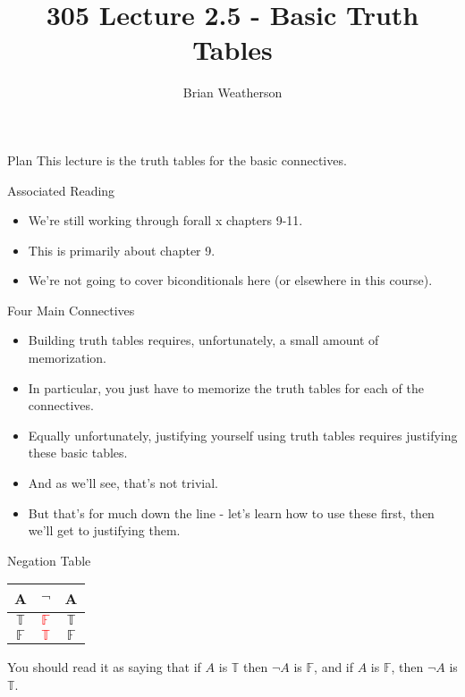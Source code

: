 \documentclass[
  ignorenonframetext,
]{beamer}
\title{305 Lecture 2.5 - Basic Truth Tables}
\author{Brian Weatherson}
\date{}
\providecommand{\tightlist}{%
  \setlength{\itemsep}{0pt}\setlength{\parskip}{0pt}}
\renewcommand{\,}{\text{, }}
\def\True{\mathbb{T}}
\def\False{\mathbb{F}}
\begin{document}
\frame{\titlepage}

\begin{frame}{Plan}
\protect\hypertarget{plan}{}
This lecture is the truth tables for the basic connectives.
\end{frame}

\begin{frame}{Associated Reading}
\protect\hypertarget{associated-reading}{}
\begin{itemize}
\tightlist
\item
  We're still working through forall x chapters 9-11.
\item
  This is primarily about chapter 9.
\item
  We're not going to cover biconditionals here (or elsewhere in this
  course).
\end{itemize}
\end{frame}

\begin{frame}{Four Main Connectives}
\protect\hypertarget{four-main-connectives}{}
\begin{itemize}
\tightlist
\item
  Building truth tables requires, unfortunately, a small amount of
  memorization.
\item
  In particular, you just have to memorize the truth tables for each of
  the connectives.
\item
  Equally unfortunately, justifying yourself using truth tables requires
  justifying these basic tables.
\item
  And as we'll see, that's not trivial.
\item
  But that's for much down the line - let's learn how to use these
  first, then we'll get to justifying them.
\end{itemize}
\end{frame}

\begin{frame}{Negation Table}
\protect\hypertarget{negation-table}{}
\begin{center}
\begin{tabular}{@{ }c | c@{ }@{ }c}
A & $\neg$ & A\\
\hline 
$\True$ & \textcolor{red}{$\False$} & $\True$\\
$\False$ & \textcolor{red}{$\True$} & $\False$\\
\end{tabular}

\end{center}

You should read it as saying that if \(A\) is \(\True\) then \(\neg A\)
is \(\False\), and if \(A\) is \(\False\), then \(\neg A\) is \(\True\).
\end{frame}
\end{document}
